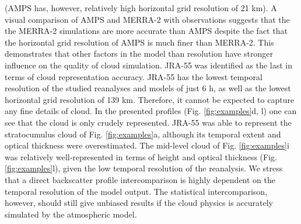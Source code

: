 (AMPS has, however, relatively high horizontal grid resolution of 21 km).
 A visual comparison of AMPS and MERRA-2 with observations suggests that the
the MERRA-2 simulations are more accurate than AMPS despite the
fact that the horizontal grid resolution of AMPS is much finer than MERRA-2.
This demonstrates that other factors in the model than resolution have
stronger influence on the quality of cloud simulation.
JRA-55
was identified as the last in terms of cloud representation accuracy. JRA-55
has the lowest temporal resolution of the studied reanalyses and models of
just 6 h, as well as the lowest horizontal grid resolution of 139 km. Therefore,
it cannot be expected to capture any fine details of cloud. In the presented
profiles (Fig. \ref{fig:examples}d, l) one can see that the cloud is only
crudely represented. JRA-55 was able to represent the stratocumulus cloud
of Fig. \ref{fig:examples}a, although its temporal extent and optical thickness
were overestimated. The mid-level cloud of Fig. \ref{fig:examples}i was
relatively well-represented in terms of height and optical thickness
(Fig. \ref{fig:examples}l), given the low temporal resolution of the reanalysis.
We stress that a direct backscatter profile intercomparison is highly dependent
on the temporal resolution of the model output. The statistical intercomparison,
however, should still give unbiased results if the cloud physics is accurately
simulated by the atmospheric model.

